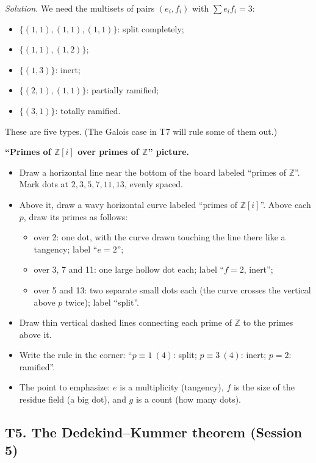 \documentclass[11pt]{article}
\newcommand{\Z}{\mathbb{Z}}
\begin{document}
\begin{enumerate}[label=\textbf{Q4.\arabic*}]
  \textit{Solution.} We need the multisets of pairs $(e_i,f_i)$ with $\sum e_if_i=3$:
  \begin{itemize}
    \item $\{(1,1),(1,1),(1,1)\}$: split completely;
    \item $\{(1,1),(1,2)\}$;
    \item $\{(1,3)\}$: inert;
    \item $\{(2,1),(1,1)\}$: partially ramified;
    \item $\{(3,1)\}$: totally ramified.
  \end{itemize}
  These are five types. (The Galois case in T7 will rule some of them out.)
\end{enumerate}

\begin{instructornote}
\textbf{``Primes of $\Z[i]$ over primes of $\Z$'' picture.}
\begin{itemize}
  \item Draw a horizontal line near the bottom of the board labeled ``primes of $\Z$''. Mark dots at $2,3,5,7,11,13$, evenly spaced.
  \item Above it, draw a wavy horizontal curve labeled ``primes of $\Z[i]$''. Above each $p$, draw its primes as follows:
  \begin{itemize}
    \item over 2: one dot, with the curve drawn touching the line there like a tangency; label ``$e=2$'';
    \item over 3, 7 and 11: one large hollow dot each; label ``$f=2$, inert'';
    \item over 5 and 13: two separate small dots each (the curve crosses the vertical above $p$ twice); label ``split''.
  \end{itemize}
  \item Draw thin vertical dashed lines connecting each prime of $\Z$ to the primes above it.
  \item Write the rule in the corner: ``$p\equiv1\ (4)$: split; $p\equiv3\ (4)$: inert; $p=2$: ramified''.
  \item The point to emphasize: $e$ is a multiplicity (tangency), $f$ is the size of the residue field (a big dot), and $g$ is a count (how many dots).
\end{itemize}
\end{instructornote}

\subsection{T5. The Dedekind--Kummer theorem (Session 5)}
\end{document}
